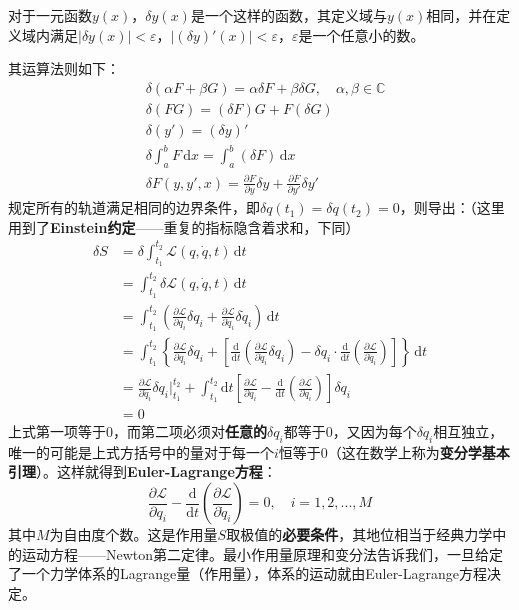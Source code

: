\documentclass[a4paper,openany]{book}
\begin{document}
对于一元函数$y(x)$，$\delta y(x)$是一个这样的函数，其定义域与$y(x)$相同，并在定义域内满足$|\delta y(x)|<\varepsilon$，$|(\delta y)'(x)|<\varepsilon$，$\varepsilon$是一个任意小的数。

其运算法则如下：
\begin{align*}
    & \delta(\alpha F + \beta G) = \alpha \delta F + \beta \delta G,\quad \alpha,\beta \in\mathbb{C} \\
    & \delta(FG) = (\delta F)G + F(\delta G) \\
    & \delta(y') = (\delta y)' \\
    & \delta \int_a^b F\,\mathrm{d}x = \int_a^b (\delta F)\,\mathrm{d}x \\
    & \delta F(y,y',x) = \frac{\partial F}{\partial y}\delta y + \frac{\partial F}{\partial y'}\delta y'
\end{align*}
规定所有的轨道满足相同的边界条件，即$\delta q(t_1) = \delta q(t_2) = 0$，则导出：（这里用到了\textbf{Einstein约定}——重复的指标隐含着求和，下同）
\begin{align*}
    \delta S
    &= \delta \int_{t_1}^{t_2} \mathcal{L}(q,\dot{q},t)\,\mathrm{d}t \\
    &= \int_{t_1}^{t_2} \delta \mathcal{L}(q,\dot{q},t)\,\mathrm{d}t \\
    &= \int_{t_1}^{t_2} \left(\frac{\partial \mathcal{L}}{\partial q_i}\delta q_i + \frac{\partial \mathcal{L}}{\partial \dot{q}_i}\delta \dot{q}_i\right)\,\mathrm{d}t \\
    &= \int_{t_1}^{t_2} \left\{\frac{\partial \mathcal{L}}{\partial q_i}\delta q_i + \left[\frac{\mathrm{d}}{\mathrm{d}t}\left(\frac{\partial \mathcal{L}}{\partial \dot{q}_i}\delta q_i\right) - \delta q_i \cdot \frac{\mathrm{d}}{\mathrm{d}t}\left(\frac{\partial \mathcal{L}}{\partial \dot{q}_i}\right) \right]\right\}\,\mathrm{d}t \\
    &= \frac{\partial \mathcal{L}}{\partial \dot{q}_i}\delta q_i\bigg|_{t_1}^{t_2} + \int_{t_1}^{t_2} \mathrm{d}t\left[\frac{\partial \mathcal{L}}{\partial q_i} - \frac{\mathrm{d}}{\mathrm{d}t}\left(\frac{\partial \mathcal{L}}{\partial \dot{q}_i}\right)\right]\delta q_i \\
    &= 0
\end{align*}
上式第一项等于0，而第二项必须对\textbf{任意的}$\delta q_i$都等于0，又因为每个$\delta q_i$相互独立，唯一的可能是上式方括号中的量对于每一个$i$恒等于0（这在数学上称为\textbf{变分学基本引理}）。这样就得到\textbf{Euler-Lagrange方程}：
\[
    \boxed{\frac{\partial \mathcal{L}}{\partial q_i} - \frac{\mathrm{d}}{\mathrm{d}t}\left(\frac{\partial \mathcal{L}}{\partial \dot{q}_i}\right) = 0,\quad i=1,2,...,M}
\]
其中$M$为自由度个数。这是作用量$S$取极值的\textbf{必要条件}，其地位相当于经典力学中的运动方程——Newton第二定律。最小作用量原理和变分法告诉我们，一旦给定了一个力学体系的Lagrange量（作用量），体系的运动就由Euler-Lagrange方程决定。
\end{document}
